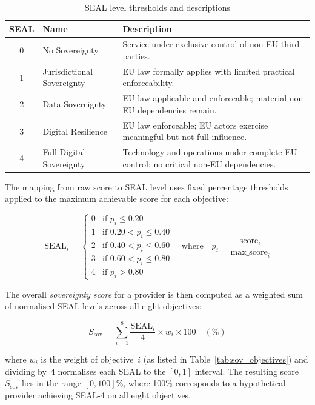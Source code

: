 \begin{table}[htbp]
\centering
\caption{SEAL level thresholds and descriptions}
\label{tab:seal_levels}
\begin{tabular}{clp{9cm}}
\toprule
\textbf{SEAL} & \textbf{Name} & \textbf{Description} \\
\midrule
0 & No Sovereignty          & Service under exclusive control of non-EU third parties. \\
1 & Jurisdictional Sovereignty & EU law formally applies with limited practical enforceability. \\
2 & Data Sovereignty        & EU law applicable and enforceable; material non-EU dependencies remain. \\
3 & Digital Resilience      & EU law enforceable; EU actors exercise meaningful but not full influence. \\
4 & Full Digital Sovereignty & Technology and operations under complete EU control; no critical non-EU dependencies. \\
\bottomrule
\end{tabular}
\end{table}

The mapping from raw score to SEAL level uses fixed percentage thresholds applied to the maximum achievable score for each objective:

\begin{equation}
  \text{SEAL}_i =
  \begin{cases}
    0 & \text{if } p_i \leq 0.20 \\
    1 & \text{if } 0.20 < p_i \leq 0.40 \\
    2 & \text{if } 0.40 < p_i \leq 0.60 \\
    3 & \text{if } 0.60 < p_i \leq 0.80 \\
    4 & \text{if } p_i > 0.80
  \end{cases}
  \quad \text{where} \quad p_i = \frac{\text{score}_i}{\text{max\_score}_i}
  \label{eq:seal_mapping}
\end{equation}

The overall \textit{sovereignty score} for a provider is then computed as a weighted sum of normalised SEAL levels across all eight objectives:

\begin{equation}
  S_{\text{sov}} = \sum_{i=1}^{8} \frac{\text{SEAL}_i}{4} \times w_i \times 100 \quad (\%)
  \label{eq:sovscore}
\end{equation}

where $w_i$ is the weight of objective~$i$ (as listed in Table~\ref{tab:sov_objectives}) and dividing by~4 normalises each SEAL to the $[0,1]$ interval. The resulting score $S_{\text{sov}}$ lies in the range $[0, 100]$\%, where 100\% corresponds to a hypothetical provider achieving SEAL-4 on all eight objectives.

